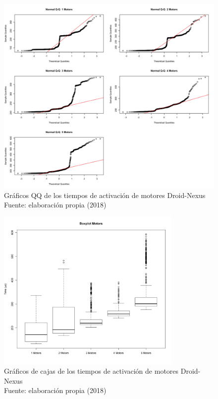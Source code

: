 \begin{figure}[H]
  \begin{center} 
   	\includegraphics[width=1.0\textwidth]{evaluation/graphics/Droid/Nexus/NormalQQMotorsDroidNexus.png} 
   	\captionsetup{justification=centering}
    \caption[Gráfico QQ de los tiempos de activación de motores Droid-Nexus]{Gráficos QQ de los tiempos de activación de motores Droid-Nexus\\Fuente: elaboración propia (2018)} 
    \label{fig:droid-nexus-QQ-motors}
  \end{center}
\end{figure}

\begin{figure}[H]
  \begin{center} 
   	\includegraphics[width=0.8\textwidth]{evaluation/graphics/Droid/Nexus/BoxplotMotorsDroidNexus.png} 
   	\captionsetup{justification=centering}
    \caption[Gráficos de cajas los tiempos de activación de de motores Droid-Nexus]{Gráficos de cajas de los tiempos de activación de motores Droid-Nexus\\Fuente: elaboración propia (2018)} 
    \label{fig:droid-nexus-boxplot-motors}
  \end{center}
\end{figure}

